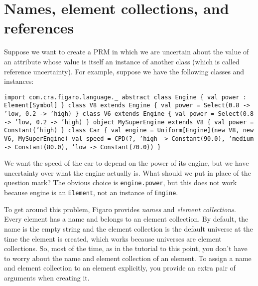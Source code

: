 \section{Names, element collections, and references}

Suppose we want to create a PRM in which we are uncertain about the value of an attribute whose value is itself an instance of another class (which is called reference uncertainty). For example, suppose we have the following classes and instances:

\begin{flushleft}
\texttt{import com.cra.figaro.language.\_
\newline 
\newline abstract class Engine \{ val power : Element[Symbol] \}
\newline class V8 extends Engine \{
\newline \tab val power = Select(0.8 -> 'low, 0.2 -> 'high) 
\newline \}
\newline class V6 extends Engine \{
\newline \tab val power = Select(0.8 -> 'low, 0.2 -> 'high)
\newline \}
\newline 
\newline object MySuperEngine extends V8 \{
\newline \tab val power = Constant('high)
\newline \}
\newline class Car \{
\newline \tab val engine = Uniform[Engine](new V8, new V6, MySuperEngine)
\newline \tab val speed = CPD(?,
\newline \tab 'high -> Constant(90.0),
\newline \tab 'medium -> Constant(80.0),
\newline \tab 'low -> Constant(70.0))
\newline \}
}
\end{flushleft}

We want the speed of the car to depend on the power of its engine, but we have uncertainty over what the engine actually is. What should we put in place of the question mark? The obvious choice is \texttt{engine.power}, but this does not work because engine is an \texttt{Element\-[Engine]}, not an instance of \texttt{Engine}.

To get around this problem, Figaro provides \emph{names} and \emph{element collections}. Every element has a name and belongs to an element collection. By default, the name is the empty string and the element collection is the default universe at the time the element is created, which works because universes are element collections. So, most of the time, as in the tutorial to this point, you don't have to worry about the name and element collection of an element. To assign a name and element collection to an element explicitly, you provide an extra pair of arguments when creating it.

